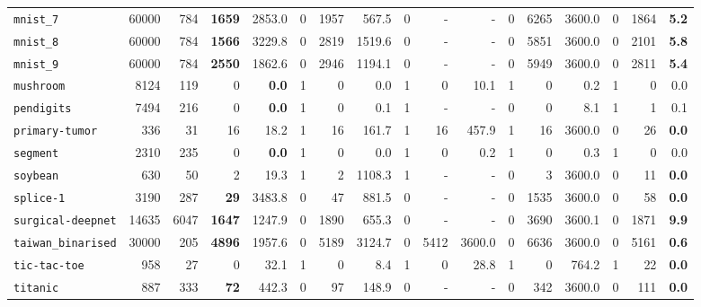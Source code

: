 \begin{tabular}{lccrrrrrrrrrrrrrr}
\texttt{mnist\_7} & \multicolumn{1}{r}{60000} & \multicolumn{1}{r}{784}  & \textbf{1659} & 2853.0 & 0 & 1957 & 567.5 & 0 & - & - & 0 & 6265 & 3600.0 & 0 & 1864 & \textbf{5.2}\\
\texttt{mnist\_8} & \multicolumn{1}{r}{60000} & \multicolumn{1}{r}{784}  & \textbf{1566} & 3229.8 & 0 & 2819 & 1519.6 & 0 & - & - & 0 & 5851 & 3600.0 & 0 & 2101 & \textbf{5.8}\\
\texttt{mnist\_9} & \multicolumn{1}{r}{60000} & \multicolumn{1}{r}{784}  & \textbf{2550} & 1862.6 & 0 & 2946 & 1194.1 & 0 & - & - & 0 & 5949 & 3600.0 & 0 & 2811 & \textbf{5.4}\\
\texttt{mushroom} & \multicolumn{1}{r}{8124} & \multicolumn{1}{r}{119}  & 0 & \textbf{0.0} & 1 & 0 & 0.0 & 1 & 0 & 10.1 & 1 & 0 & 0.2 & 1 & 0 & 0.0\\
\texttt{pendigits} & \multicolumn{1}{r}{7494} & \multicolumn{1}{r}{216}  & 0 & \textbf{0.0} & 1 & 0 & 0.1 & 1 & - & - & 0 & 0 & 8.1 & 1 & 1 & 0.1\\
\texttt{primary-tumor} & \multicolumn{1}{r}{336} & \multicolumn{1}{r}{31}  & 16 & 18.2 & 1 & 16 & 161.7 & 1 & 16 & 457.9 & 1 & 16 & 3600.0 & 0 & 26 & \textbf{0.0}\\
\texttt{segment} & \multicolumn{1}{r}{2310} & \multicolumn{1}{r}{235}  & 0 & \textbf{0.0} & 1 & 0 & 0.0 & 1 & 0 & 0.2 & 1 & 0 & 0.3 & 1 & 0 & 0.0\\
\texttt{soybean} & \multicolumn{1}{r}{630} & \multicolumn{1}{r}{50}  & 2 & 19.3 & 1 & 2 & 1108.3 & 1 & - & - & 0 & 3 & 3600.0 & 0 & 11 & \textbf{0.0}\\
\texttt{splice-1} & \multicolumn{1}{r}{3190} & \multicolumn{1}{r}{287}  & \textbf{29} & 3483.8 & 0 & 47 & 881.5 & 0 & - & - & 0 & 1535 & 3600.0 & 0 & 58 & \textbf{0.0}\\
\texttt{surgical-deepnet} & \multicolumn{1}{r}{14635} & \multicolumn{1}{r}{6047}  & \textbf{1647} & 1247.9 & 0 & 1890 & 655.3 & 0 & - & - & 0 & 3690 & 3600.1 & 0 & 1871 & \textbf{9.9}\\
\texttt{taiwan\_binarised} & \multicolumn{1}{r}{30000} & \multicolumn{1}{r}{205}  & \textbf{4896} & 1957.6 & 0 & 5189 & 3124.7 & 0 & 5412 & 3600.0 & 0 & 6636 & 3600.0 & 0 & 5161 & \textbf{0.6}\\
\texttt{tic-tac-toe} & \multicolumn{1}{r}{958} & \multicolumn{1}{r}{27}  & 0 & 32.1 & 1 & 0 & 8.4 & 1 & 0 & 28.8 & 1 & 0 & 764.2 & 1 & 22 & \textbf{0.0}\\
\texttt{titanic} & \multicolumn{1}{r}{887} & \multicolumn{1}{r}{333}  & \textbf{72} & 442.3 & 0 & 97 & 148.9 & 0 & - & - & 0 & 342 & 3600.0 & 0 & 111 & \textbf{0.0}\\

\end{tabular}
